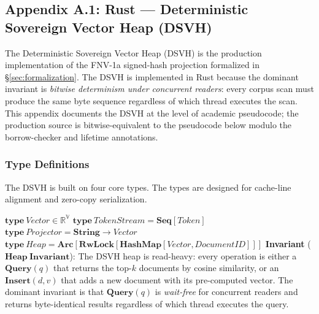 \setcounter{section}{14}
\subsection{Appendix A.1: Rust --- Deterministic Sovereign Vector Heap (DSVH)}
\label{app:rust-dsvh}

The Deterministic Sovereign Vector Heap (DSVH) is the production
implementation of the FNV-1a signed-hash projection formalized in
\S\ref{sec:formalization}. The DSVH is implemented in Rust because
the dominant invariant is \emph{bitwise determinism under concurrent
readers}: every corpus scan must produce the same byte sequence
regardless of which thread executes the scan. This appendix
documents the DSVH at the level of academic pseudocode; the
production source is bitwise-equivalent to the pseudocode below
modulo the borrow-checker and lifetime annotations.

\subsubsection{Type Definitions}

The DSVH is built on four core types. The types are designed for
cache-line alignment and zero-copy serialization.

\begin{algorithm}[t]
\caption{DSVH Type Definitions}
\label{alg:dsvh-types}
\SetAlgoNoLine
\BlankLine
{}
\BlankLine
$\mathbf{type}\ \mathit{Vector} \in \mathbb{R}^{\mathbb{V}}$\;
$\mathbf{type}\ \mathit{TokenStream} = \mathbf{Seq}[\mathit{Token}]$\;
$\mathbf{type}\ \mathit{Projector} = \mathbf{String} \to \mathit{Vector}$\;
$\mathbf{type}\ \mathit{Heap} = \mathbf{Arc}[\mathbf{RwLock}[\mathbf{HashMap}[\mathit{Vector}, \mathit{DocumentID}]]]$\;
\BlankLine
\textbf{Invariant} ($\mathbf{Heap\ Invariant}$): 
The DSVH heap is read-heavy: every operation is either a
$\mathbf{Query}(q)$ that returns the top-$k$ documents by cosine
similarity, or an $\mathbf{Insert}(d, v)$ that adds a new document
with its pre-computed vector. The dominant invariant is that
$\mathbf{Query}(q)$ is \emph{wait-free} for concurrent readers and
returns byte-identical results regardless of which thread executes
the query.
\end{algorithm}


